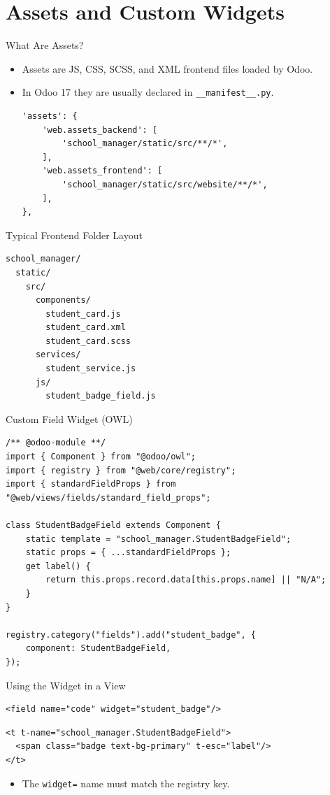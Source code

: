 \section{Assets and Custom Widgets}

\begin{frame}[fragile]{What Are Assets?}
	\begin{itemize}
		\item Assets are JS, CSS, SCSS, and XML frontend files loaded by Odoo.
		\item In Odoo 17 they are usually declared in \texttt{\_\_manifest\_\_.py}.
\begin{lstlisting}
'assets': {
	'web.assets_backend': [
		'school_manager/static/src/**/*',
	],
	'web.assets_frontend': [
		'school_manager/static/src/website/**/*',
	],
},
\end{lstlisting}
	\end{itemize}
\end{frame}

\begin{frame}[fragile]{Typical Frontend Folder Layout}
\begin{lstlisting}
school_manager/
  static/
	src/
	  components/
		student_card.js
		student_card.xml
		student_card.scss
	  services/
		student_service.js
	  js/
		student_badge_field.js
\end{lstlisting}
\end{frame}

\begin{frame}[fragile]{Custom Field Widget (OWL)}
\begin{lstlisting}[style=js]
/** @odoo-module **/
import { Component } from "@odoo/owl";
import { registry } from "@web/core/registry";
import { standardFieldProps } from "@web/views/fields/standard_field_props";

class StudentBadgeField extends Component {
	static template = "school_manager.StudentBadgeField";
	static props = { ...standardFieldProps };
	get label() {
		return this.props.record.data[this.props.name] || "N/A";
	}
}

registry.category("fields").add("student_badge", {
	component: StudentBadgeField,
});
\end{lstlisting}
\end{frame}

\begin{frame}[fragile]{Using the Widget in a View}
\begin{lstlisting}[style=xml]
<field name="code" widget="student_badge"/>
\end{lstlisting}
\begin{lstlisting}[style=xml]
<t t-name="school_manager.StudentBadgeField">
  <span class="badge text-bg-primary" t-esc="label"/>
</t>
\end{lstlisting}
	\begin{itemize}
		\item The \texttt{widget=} name must match the registry key.
	\end{itemize}
\end{frame}

